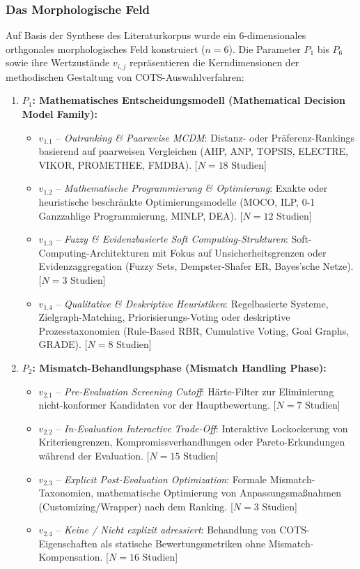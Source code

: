 \subsubsection{Das Morphologische Feld}

Auf Basis der Synthese des Literaturkorpus wurde ein 6-dimensionales orthgonales morphologisches Feld konstruiert ($n = 6$). Die Parameter $P_1$ bis $P_6$ sowie ihre Wertzustände $v_{i,j}$ repräsentieren die Kerndimensionen der methodischen Gestaltung von COTS-Auswahlverfahren:

\begin{enumerate}
    \item \textbf{$P_1$: Mathematisches Entscheidungsmodell (Mathematical Decision Model Family):}
    \begin{itemize}
        \item $v_{1.1}$ -- \textit{Outranking \& Paarweise MCDM}: Distanz- oder Präferenz-Rankings basierend auf paarweisen Vergleichen (AHP, ANP, TOPSIS, ELECTRE, VIKOR, PROMETHEE, FMDBA). [$N = 18$ Studien]
        \item $v_{1.2}$ -- \textit{Mathematische Programmierung \& Optimierung}: Exakte oder heuristische beschränkte Optimierungsmodelle (MOCO, ILP, 0-1 Ganzzahlige Programmierung, MINLP, DEA). [$N = 12$ Studien]
        \item $v_{1.3}$ -- \textit{Fuzzy \& Evidenzbasierte Soft Computing-Strukturen}: Soft-Computing-Architekturen mit Fokus auf Unsicherheitsgrenzen oder Evidenzaggregation (Fuzzy Sets, Dempster-Shafer ER, Bayes'sche Netze). [$N = 3$ Studien]
        \item $v_{1.4}$ -- \textit{Qualitative \& Deskriptive Heuristiken}: Regelbasierte Systeme, Zielgraph-Matching, Priorisierungs-Voting oder deskriptive Prozesstaxonomien (Rule-Based RBR, Cumulative Voting, Goal Graphs, GRADE). [$N = 8$ Studien]
    \end{itemize}

    \item \textbf{$P_2$: Mismatch-Behandlungsphase (Mismatch Handling Phase):}
    \begin{itemize}
        \item $v_{2.1}$ -- \textit{Pre-Evaluation Screening Cutoff}: Härte-Filter zur Eliminierung nicht-konformer Kandidaten vor der Hauptbewertung. [$N = 7$ Studien]
        \item $v_{2.2}$ -- \textit{In-Evaluation Interactive Trade-Off}: Interaktive Lockockerung von Kriteriengrenzen, Kompromissverhandlungen oder Pareto-Erkundungen während der Evaluation. [$N = 15$ Studien]
        \item $v_{2.3}$ -- \textit{Explicit Post-Evaluation Optimization}: Formale Mismatch-Taxonomien, mathematische Optimierung von Anpassungsmaßnahmen (Customizing/Wrapper) nach dem Ranking. [$N = 3$ Studien]
        \item $v_{2.4}$ -- \textit{Keine / Nicht explizit adressiert}: Behandlung von COTS-Eigenschaften als statische Bewertungsmetriken ohne Mismatch-Kompensation. [$N = 16$ Studien]
    \end{itemize}


\end{enumerate}
